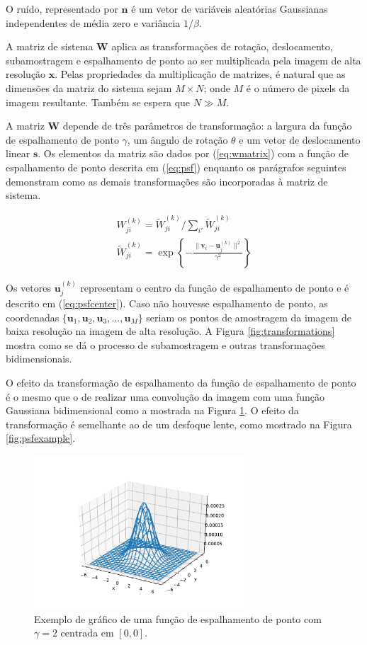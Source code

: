 \documentclass[12pt,openright,oneside,a4paper,english,brazil]{abntex2}
\begin{document}
O ruído, representado por $\mathbf{n}$ é um vetor de variáveis aleatórias Gaussianas independentes de média zero e variância $1/\beta$.

A matriz de sistema $\mathbf{W}$ aplica as transformações de rotação, deslocamento, subamostragem e espalhamento de ponto ao ser multiplicada pela imagem de alta resolução $\mathbf{x}$.
Pelas propriedades da multiplicação de matrizes, é natural que as dimensões da matriz do sistema sejam $M \times N$; onde $M$ é o número de pixels da imagem resultante.
Também se espera que $N \gg M$.

A matriz $\mathbf{W}$ depende de três parâmetros de transformação: a largura da função de espalhamento de ponto $\gamma$, um ângulo de rotação $\theta$ e um vetor de deslocamento linear $\mathbf{s}$.
Os elementos da matriz são dados por (\ref{eq:wmatrix}) com a função de espalhamento de ponto descrita em (\ref{eq:psf}) enquanto os parágrafos seguintes demonstram como as demais transformações são incorporadas à matriz de sistema.

\begin{gather}
	\label{eq:wmatrix}
	W^{(k)}_{ji} = \widetilde{W}^{(k)}_{ji} / \sum_{i'} \widetilde{W}^{(k)}_{ji} \\
	\label{eq:psf}
	\widetilde{W}^{(k)}_{ji} = \exp \left\{- \frac{\|\mathbf{v}_i - \mathbf{u}^{(k)}_j\|^2}{\gamma^2} \right\}
\end{gather}

Os vetores $\mathbf{u}^{(k)}_j$ representam o centro da função de espalhamento de ponto e é descrito em (\ref{eq:psfcenter}).
Caso não houvesse espalhamento de ponto, as coordenadas $\{\mathbf{u}_1, \mathbf{u}_2,\mathbf{u}_3,..., \mathbf{u}_M\}$ seriam os pontos de amostragem da imagem de baixa resolução na imagem de alta resolução.
A Figura \ref{fig:transformations} mostra como se dá o processo de subamostragem e outras transformações bidimensionais.

O efeito da transformação de espalhamento da função de espalhamento de ponto é o mesmo que o de realizar uma convolução da imagem com uma função Gaussiana bidimensional como a mostrada na Figura \ref{fig:psfplot}.
O efeito da transformação é semelhante ao de um desfoque lente, como mostrado na Figura \ref{fig:psfexample}.


\begin{figure}[h]
	\centering
	\includegraphics[width = 0.7\textwidth]{./figures/psf1.pdf}
	\caption{Exemplo de gráfico de uma função de espalhamento de ponto com $\gamma = 2$ centrada em $[0,0]$.}
	\label{fig:psfplot}
\end{figure}
\end{document}
